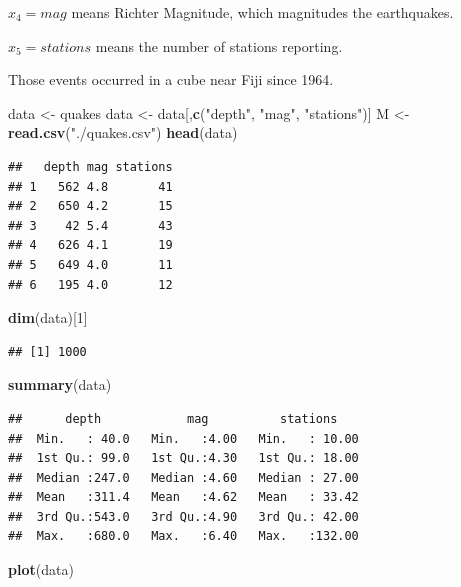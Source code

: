 \documentclass[]{article}
\newenvironment{Shaded}{\begin{snugshade}}{\end{snugshade}}
\newcommand{\KeywordTok}[1]{\textcolor[rgb]{0.13,0.29,0.53}{\textbf{#1}}}
\newcommand{\DecValTok}[1]{\textcolor[rgb]{0.00,0.00,0.81}{#1}}
\newcommand{\StringTok}[1]{\textcolor[rgb]{0.31,0.60,0.02}{#1}}
\newcommand{\NormalTok}[1]{#1}
\begin{document}
\(x_4 = mag\) means Richter Magnitude, which magnitudes the earthquakes.

\(x_5 = stations\) means the number of stations reporting.

Those events occurred in a cube near Fiji since 1964.

\begin{Shaded}
\begin{Highlighting}[]
\NormalTok{data <-}\StringTok{ }\NormalTok{quakes}
\NormalTok{data <-}\StringTok{ }\NormalTok{data[,}\KeywordTok{c}\NormalTok{(}\StringTok{"depth"}\NormalTok{, }\StringTok{"mag"}\NormalTok{, }\StringTok{"stations"}\NormalTok{)]}
\NormalTok{M <-}\StringTok{ }\KeywordTok{read.csv}\NormalTok{(}\StringTok{"./quakes.csv"}\NormalTok{)}
\KeywordTok{head}\NormalTok{(data)}
\end{Highlighting}
\end{Shaded}

\begin{verbatim}
##   depth mag stations
## 1   562 4.8       41
## 2   650 4.2       15
## 3    42 5.4       43
## 4   626 4.1       19
## 5   649 4.0       11
## 6   195 4.0       12
\end{verbatim}

\begin{Shaded}
\begin{Highlighting}[]
\KeywordTok{dim}\NormalTok{(data)[}\DecValTok{1}\NormalTok{]}
\end{Highlighting}
\end{Shaded}

\begin{verbatim}
## [1] 1000
\end{verbatim}

\begin{Shaded}
\begin{Highlighting}[]
\KeywordTok{summary}\NormalTok{(data)}
\end{Highlighting}
\end{Shaded}

\begin{verbatim}
##      depth            mag          stations     
##  Min.   : 40.0   Min.   :4.00   Min.   : 10.00  
##  1st Qu.: 99.0   1st Qu.:4.30   1st Qu.: 18.00  
##  Median :247.0   Median :4.60   Median : 27.00  
##  Mean   :311.4   Mean   :4.62   Mean   : 33.42  
##  3rd Qu.:543.0   3rd Qu.:4.90   3rd Qu.: 42.00  
##  Max.   :680.0   Max.   :6.40   Max.   :132.00
\end{verbatim}

\begin{Shaded}
\begin{Highlighting}[]
\KeywordTok{plot}\NormalTok{(data)}
\end{Highlighting}
\end{Shaded}
\end{document}
